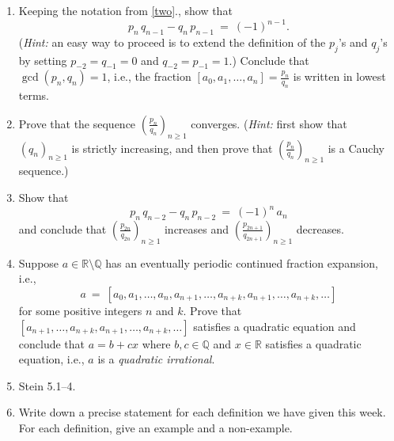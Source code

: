 \documentclass[11pt]{article}
\def\Q{\mathbb{Q}}
\def\R{\mathbb{R}}
\begin{document}
\begin{enumerate}
\item Keeping the notation from \ref{two}., show that
\[
  p_n \, q_{ n-1 } - q_n \, p_{ n-1 } \ = \ (-1)^{ n-1 } .
\]
(\emph{Hint:} an easy way to proceed is to extend the definition of the $p_j$'s and $q_j$'s by setting $p_{ -2 }
= q_{ -1 } = 0$ and $q_{ -2 } = p_{ -1 } = 1$.)
Conclude that $\gcd(p_n, q_n) = 1$, i.e., the fraction $[a_0, a_1, \dots, a_n] = \frac{ p_n }{ q_n }$ is written
in lowest terms.

\item Prove that the sequence $( \frac{ p_n }{ q_n } )_{ n \ge 1 }$ converges.
(\emph{Hint:} first show that $(q_n)_{ n \ge 1 }$ is strictly increasing, and then prove that $( \frac{ p_n }{ q_n } )_{ n \ge 1 }$ is a Cauchy sequence.)

\item Show that
\[
  p_n \, q_{ n-2 } - q_n \, p_{ n-2 } \ = \ (-1)^n \, a_n
\]
and conclude that $( \frac{ p_{ 2n } }{ q_{ 2n } } )_{ n \ge 1 }$ increases and $( \frac{ p_{ 2n+1 } }{ q_{ 2n+1 } } )_{ n \ge 1 }$ decreases.

\item Suppose $a \in \R \setminus \Q$ has an eventually periodic continued fraction expansion, i.e.,
\[
  a \ = \ [a_0, a_1, \dots, a_n, a_{ n+1 } , \dots, a_{ n+k }, a_{ n+1 } , \dots, a_{ n+k }, \dots ]
\]
for some positive integers $n$ and $k$. Prove that $[a_{ n+1 } , \dots, a_{ n+k }, a_{ n+1 } , \dots, a_{ n+k },
\dots ]$ satisfies a quadratic equation and conclude that $a = b+cx$ where $b, c \in \Q$ and $x \in \R$
satisfies a quadratic equation, i.e., $a$ is a \emph{quadratic irrational}.

\item Stein 5.1--4. 
 
\item Write down a precise statement for each definition we have given this week.
For each definition, give an example and a non-example.

\end{enumerate}
\end{document}
